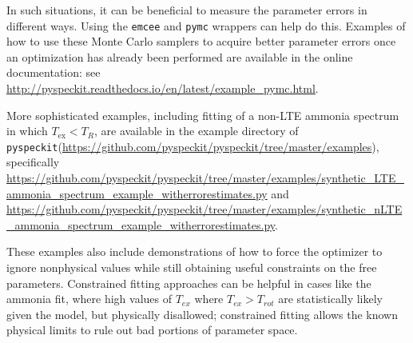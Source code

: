 \documentclass[twocolumn]{aastex63}
\newcommand{\pyspeckit}{\texttt{pyspeckit}\xspace}
\begin{document}
In such situations, it can be beneficial to measure the parameter errors
in different ways.  Using the \texttt{emcee} and \texttt{pymc} wrappers
can help do this.  Examples of how to use these Monte Carlo samplers
to acquire better parameter errors once an optimization has already
been performed are available in the online documentation:
see \url{http://pyspeckit.readthedocs.io/en/latest/example_pymc.html}.

More sophisticated examples, including fitting of a non-LTE ammonia spectrum
in which $T_{\mathrm{ex}} < T_{R}$, are available in the example directory
of \pyspeckit (\url{https://github.com/pyspeckit/pyspeckit/tree/master/examples}),
specifically
\url{https://github.com/pyspeckit/pyspeckit/tree/master/examples/synthetic_LTE_ammonia_spectrum_example_witherrorestimates.py}
and
\url{https://github.com/pyspeckit/pyspeckit/tree/master/examples/synthetic_nLTE_ammonia_spectrum_example_witherrorestimates.py}.

These examples also include demonstrations of how to force the optimizer to
ignore nonphysical values while still obtaining useful constraints on the free
parameters.  Constrained fitting approaches can be helpful in cases like the
ammonia fit, where high values of $T_{ex}$ where $T_{ex}>T_{rot}$ are
statistically likely given the model, but physically disallowed; constrained
fitting allows the known physical limits to rule out bad portions of parameter
space.
\end{document}
